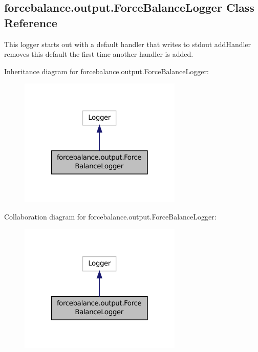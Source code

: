 \hypertarget{classforcebalance_1_1output_1_1ForceBalanceLogger}{\subsection{forcebalance.\-output.\-Force\-Balance\-Logger Class Reference}
\label{classforcebalance_1_1output_1_1ForceBalanceLogger}
}


This logger starts out with a default handler that writes to stdout add\-Handler removes this default the first time another handler is added.  




Inheritance diagram for forcebalance.\-output.\-Force\-Balance\-Logger\-:\nopagebreak
\begin{figure}[H]
\begin{center}
\leavevmode
\includegraphics[width=220pt]{classforcebalance_1_1output_1_1ForceBalanceLogger__inherit__graph}
\end{center}
\end{figure}


Collaboration diagram for forcebalance.\-output.\-Force\-Balance\-Logger\-:\nopagebreak
\begin{figure}[H]
\begin{center}
\leavevmode
\includegraphics[width=220pt]{classforcebalance_1_1output_1_1ForceBalanceLogger__coll__graph}
\end{center}
\end{figure}
